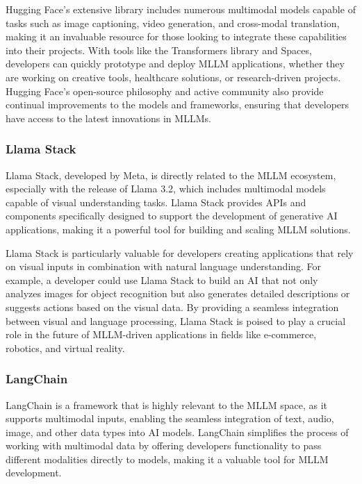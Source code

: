 Hugging Face’s extensive library includes numerous multimodal models capable of tasks such as image captioning, video generation, and cross-modal translation, making it an invaluable resource for those looking to integrate these capabilities into their projects. 
With tools like the Transformers library and Spaces, developers can quickly prototype and deploy MLLM applications, whether they are working on creative tools, healthcare solutions, or research-driven projects. 
Hugging Face’s open-source philosophy and active community also provide continual improvements to the models and frameworks, ensuring that developers have access to the latest innovations in MLLMs.

\subsubsection{Llama Stack}

Llama Stack, developed by Meta, is directly related to the MLLM ecosystem, especially with the release of Llama 3.2, which includes multimodal models capable of visual understanding tasks. 
Llama Stack provides APIs and components specifically designed to support the development of generative AI applications, making it a powerful tool for building and scaling MLLM solutions.

Llama Stack is particularly valuable for developers creating applications that rely on visual inputs in combination with natural language understanding. 
For example, a developer could use Llama Stack to build an AI that not only analyzes images for object recognition but also generates detailed descriptions or suggests actions based on the visual data. 
By providing a seamless integration between visual and language processing, Llama Stack is poised to play a crucial role in the future of MLLM-driven applications in fields like e-commerce, robotics, and virtual reality.

\subsubsection{LangChain}

LangChain is a framework that is highly relevant to the MLLM space, as it supports multimodal inputs, enabling the seamless integration of text, audio, image, and other data types into AI models. 
LangChain simplifies the process of working with multimodal data by offering developers functionality to pass different modalities directly to models, making it a valuable tool for MLLM development.

